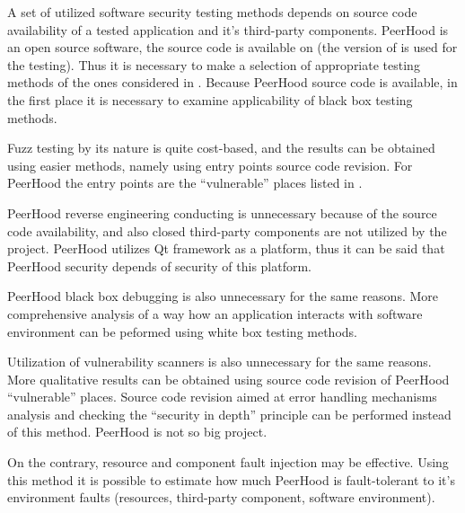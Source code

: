 %
A set of utilized software security testing methods depends on source code availability of a tested application and it's third-party components. 
%
PeerHood is an open source software, the source code is available on  (the  version of  is used for the testing). 
%
Thus it is necessary to make a selection of appropriate testing methods of the ones considered in . 
%
Because PeerHood source code is available, in the first place it is necessary to examine applicability of black box testing methods. 



%
Fuzz testing by its nature is quite cost-based, and the results can be obtained using easier methods, namely using entry points source code revision. 
%
For PeerHood the entry points are the ``vulnerable'' places listed in . 

%
PeerHood reverse engineering conducting is unnecessary because of the source code availability, and also closed third-party components are not utilized by the project. 
%
PeerHood utilizes Qt framework  as a platform, thus it can be said that PeerHood security depends of security of this platform. 

%
PeerHood black box debugging is also unnecessary for the same reasons. 
%
More comprehensive analysis of a way how an application interacts with software environment can be peformed using white box testing methods. 

%
Utilization of vulnerability scanners is also unnecessary for the same reasons. 
%
More qualitative results can be obtained using source code revision of PeerHood ``vulnerable'' places. 
%
Source code revision aimed at error handling mechanisms analysis and checking the ``security in depth'' principle can be performed instead of this method. 
%
PeerHood is not so big project. 

%
On the contrary, resource and component fault injection may be effective. 
%
Using this method it is possible to estimate how much PeerHood is fault-tolerant to it's environment faults (resources, third-party component, software environment). 


